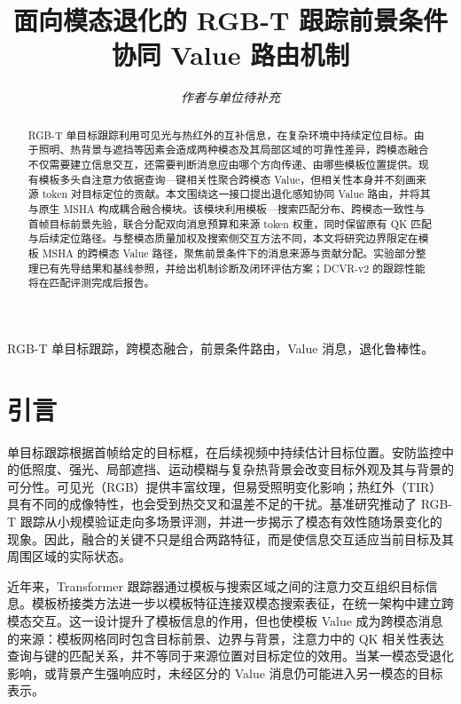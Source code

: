 \documentclass[journal]{IEEEtran}
\begin{document}
\title{面向模态退化的 RGB-T 跟踪前景条件协同 Value 路由机制}
\author{\textit{作者与单位待补充}}
\maketitle

\begin{abstract}
RGB-T 单目标跟踪利用可见光与热红外的互补信息，在复杂环境中持续定位目标。由于照明、热背景与遮挡等因素会造成两种模态及其局部区域的可靠性差异，跨模态融合不仅需要建立信息交互，还需要判断消息应由哪个方向传递、由哪些模板位置提供。现有模板多头自注意力依据查询—键相关性聚合跨模态 Value，但相关性本身并不刻画来源 token 对目标定位的贡献。本文围绕这一接口提出退化感知协同 Value 路由，并将其与原生 MSHA 构成耦合融合模块。该模块利用模板—搜索匹配分布、跨模态一致性与首帧目标前景先验，联合分配双向消息预算和来源 token 权重，同时保留原有 QK 匹配与后续定位路径。与整模态质量加权及搜索侧交互方法不同，本文将研究边界限定在模板 MSHA 的跨模态 Value 路径，聚焦前景条件下的消息来源与贡献分配。实验部分整理已有先导结果和基线参照，并给出机制诊断及闭环评估方案；DCVR-v2 的跟踪性能将在匹配评测完成后报告。
\end{abstract}

\begin{IEEEkeywords}
RGB-T 单目标跟踪，跨模态融合，前景条件路由，Value 消息，退化鲁棒性。
\end{IEEEkeywords}

\section{引言}
单目标跟踪根据首帧给定的目标框，在后续视频中持续估计目标位置。安防监控中的低照度、强光、局部遮挡、运动模糊与复杂热背景会改变目标外观及其与背景的可分性。可见光（RGB）提供丰富纹理，但易受照明变化影响；热红外（TIR）具有不同的成像特性，也会受到热交叉和温差不足的干扰。基准研究推动了 RGB-T 跟踪从小规模验证走向多场景评测，并进一步揭示了模态有效性随场景变化的现象\cite{li2019benchmark,li2022lasher,tang2025mvrgbt}。因此，融合的关键不只是组合两路特征，而是使信息交互适应当前目标及其周围区域的实际状态。

近年来，Transformer 跟踪器通过模板与搜索区域之间的注意力交互组织目标信息。模板桥接类方法进一步以模板特征连接双模态搜索表征，在统一架构中建立跨模态交互\cite{hui2023tbsi,li2025tbsi}。这一设计提升了模板信息的作用，但也使模板 Value 成为跨模态消息的来源：模板网格同时包含目标前景、边界与背景，注意力中的 QK 相关性表达查询与键的匹配关系，并不等同于来源位置对目标定位的效用。当某一模态受退化影响，或背景产生强响应时，未经区分的 Value 消息仍可能进入另一模态的目标表示。
\end{document}
